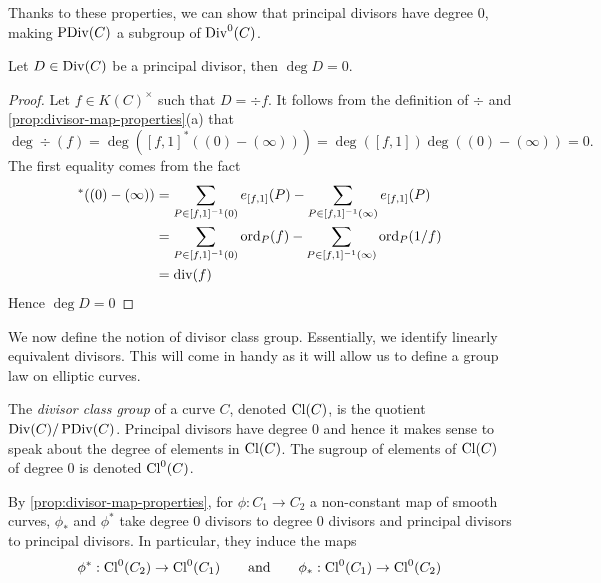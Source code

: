 Thanks to these properties, we can show that principal divisors have degree
0, making $\operatorname{PDiv}(C)$ a subgroup of $\operatorname{Div}^0(C)$.

\begin{proposition}
	Let $D \in \operatorname{Div}(C)$ be a principal divisor, then $\deg D = 0$.
\end{proposition}

\begin{proof}
	Let $f \in K(C)^\times$ such that $D = \div f$. It follows from the
	definition of $\div$ and \ref{prop:divisor-map-properties}(a) that
	\begin{equation*}
		\deg \div(f) = \deg([f, 1]^*((0) - (\infty)))
		= \deg([f, 1])\deg((0) - (\infty)) = 0.
	\end{equation*}
	The first equality comes from the fact
	\begin{align*}
		[f, 1]^*((0) - (\infty)) &= \sum_{P \in [f, 1]^{-1}(0)}e_{[f, 1]}(P)
		- \sum_{P \in [f, 1]^{-1}(\infty)}e_{[f, 1]}(P)\\
		&= \sum_{P \in [f, 1]^{-1}(0)}\ord_P(f)
		- \sum_{P \in [f, 1]^{-1}(\infty)}\ord_P(1/f)\\
		&= \div (f)
	\end{align*}
	Hence $\deg D = 0$
\end{proof}

We now define the notion of divisor class group. Essentially, we identify
linearly equivalent divisors. This will come in handy as it will allow us
to define a group law on elliptic curves.

\begin{definition}
	The \emph{divisor class group} of a curve $C$,
	denoted $\operatorname{Cl}(C)$, is the quotient $\operatorname{Div}(C)/\operatorname{PDiv}(C)$.
	Principal divisors have degree $0$ and hence it makes sense to speak about
	the degree of elements in $\operatorname{Cl}(C)$. The sugroup of elements of $\operatorname{Cl}(C)$ of
	degree $0$ is denoted $\operatorname{Cl}^0(C)$.
\end{definition}

\begin{remark}
	By \ref{prop:divisor-map-properties}, for $\phi: C_1\to C_2$ a non-constant
	map of smooth curves, $\phi_*$ and $\phi^*$ take degree 0 divisors to degree
	0 divisors and principal divisors to principal divisors.
	In particular, they induce the maps
	\begin{equation*}
		\phi^*: \operatorname{Cl}^0(C_2) \to \operatorname{Cl}^0(C_1)
		\qquad\textrm{and}\qquad
		\phi_*: \operatorname{Cl}^0(C_1) \to \operatorname{Cl}^0(C_2)
	\end{equation*}
\end{remark}

